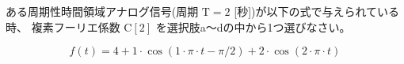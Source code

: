 ある周期性時間領域アナログ信号(周期 $\textrm{T} = 2$ [秒])が以下の式で与えられている時、
複素フーリエ係数 $\textrm{C}[2]$ を選択肢a〜dの中から1つ選びなさい。

\[
f(t) = 
4
+ 1 \cdot \cos( 1 \cdot \pi \cdot t - \pi/2)
+ 2 \cdot \cos( 2 \cdot \pi \cdot t )
\]
